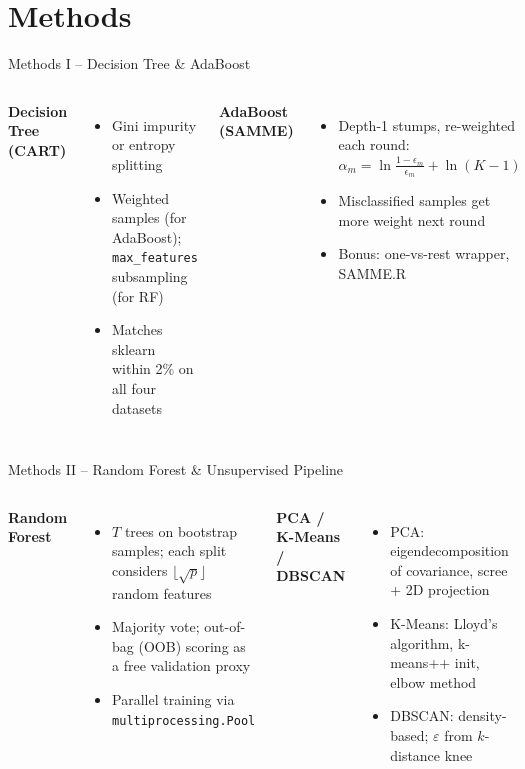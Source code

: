 \documentclass[aspectratio=169,11pt]{beamer}
\begin{document}
\section{Methods}
\begin{frame}{Methods I -- Decision Tree \& AdaBoost}
\begin{columns}[t]
\textbf{Decision Tree (CART)}
\begin{itemize}\small
  \item Gini impurity or entropy splitting
  \item Weighted samples (for AdaBoost); \texttt{max\_features} subsampling (for RF)
  \item Matches sklearn within 2\% on all four datasets
\end{itemize}
\textbf{AdaBoost (SAMME)}
\begin{itemize}\small
  \item Depth-1 stumps, re-weighted each round:\\
  $\alpha_m = \ln\frac{1-\epsilon_m}{\epsilon_m} + \ln(K-1)$
  \item Misclassified samples get more weight next round
  \item Bonus: one-vs-rest wrapper, SAMME.R
\end{itemize}
\end{columns}
\end{frame}

\begin{frame}{Methods II -- Random Forest \& Unsupervised Pipeline}
\begin{columns}[t]
\textbf{Random Forest}
\begin{itemize}\small
  \item $T$ trees on bootstrap samples; each split considers $\lfloor\sqrt{p}\rfloor$ random features
  \item Majority vote; out-of-bag (OOB) scoring as a free validation proxy
  \item Parallel training via \texttt{multiprocessing.Pool}
\end{itemize}
\textbf{PCA / K-Means / DBSCAN}
\begin{itemize}\small
  \item PCA: eigendecomposition of covariance, scree + 2D projection
  \item K-Means: Lloyd's algorithm, k-means++ init, elbow method
  \item DBSCAN: density-based; $\varepsilon$ from $k$-distance knee
\end{itemize}
\end{columns}
\end{frame}
\end{document}
